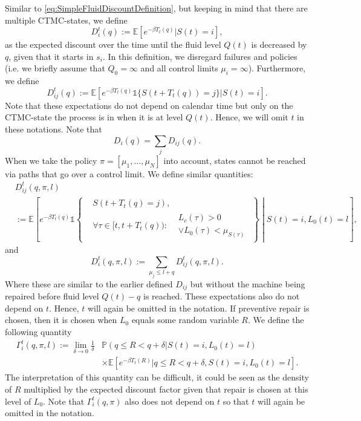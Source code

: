 \documentclass[a4paper]{thesis}
\theoremstyle{definition}
\begin{document}
Similar to \eqref{eq:SimpleFluidDiscountDefinition}, but keeping in mind that there are multiple CTMC-states, we define
\[
D_{i}^t(q):=\mathbb{E}[e^{-\beta T_t(q)}|S(t)=i],
\]
as the expected discount over the time until the fluid level $Q(t)$ is decreased by $q$, given that it starts in $s_i$.
In this definition, we disregard failures and policies (i.e. we briefly assume that $Q_0=\infty$ and all control limits $\mu_i=\infty$).
Furthermore, we define
\[
D_{ij}^t(q):=\mathbb{E}[e^{-\beta T_t(q)}\mathds{1}\{S(t+T_t(q))=j\}|S(t)=i].
\]
Note that these expectations do not depend on calendar time but only on the CTMC-state the process is in when it is at level $Q(t)$.
Hence, we will omit $t$ in these notations.
Note that
\[
D_{i}(q)=\sum\limits_{j}D_{ij}(q).
\]
When we take the policy $\pi=[\mu_1,...,\mu_N]$ into account, states cannot be reached via paths that go over a control limit.
We define similar quantities:
\[
\begin{split}
&D_{ij}^t(q,\pi,l)\\
&:=\mathbb{E}\left[e^{-\beta T_t(q)}\mathds{1}\left\{\begin{split}
&S(t+T_t(q)=j),\\
&\forall \tau\in[t,t+T_t(q)):
\begin{split}
&L_c(\tau)>0\\&\vee L_0(\tau)<\mu_{S(\tau)}
\end{split}
\end{split}\right\}\middle| S(t)=i,L_0(t)=l\right],
\end{split}
\]
and
\[
D_{i}^t(q,\pi,l):=\sum\limits_{\mu_j\leq l+q}D_{ij}^t(q,\pi,l).
\]
Where these are similar to the earlier defined $D_{ij}$ but without the machine being repaired before fluid level $Q(t)-q$ is reached.
These expectations also do not depend on $t$.
Hence, $t$ will again be omitted in the notation.
If preventive repair is chosen, then it is chosen when $L_0$ equals some random variable $R$.
We define the following quantity
\[
\begin{split}
\Gamma_i^t(q,\pi,l):=\lim\limits_{\delta\rightarrow 0}\frac1\delta&\mathbb{P}(q\leq R<q+\delta|S(t)=i,L_0(t)=l)\\
&\times\mathbb{E}[e^{-\beta T_t(R)}|q\leq R<q+\delta,S(t)=i,L_0(t)=l].
\end{split}
\]
The interpretation of this quantity can be difficult, it could be seen as the density of $R$ multiplied by the expected discount factor given that repair is chosen at this level of $L_0$.
Note that $\Gamma_i^t(q,\pi)$ also does not depend on $t$ so that $t$ will again be omitted in the notation.
\end{document}
